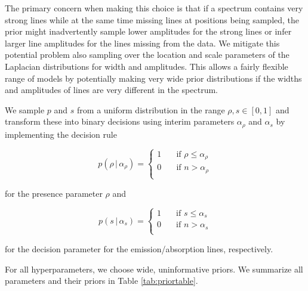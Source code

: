 \documentclass[12pt]{emulateapj}
\newcommand{\given}{\,|\,}
\begin{document}
The primary concern when making this choice is that if a spectrum contains very strong lines while at the same time missing lines at positions being sampled, the prior might inadvertently sample lower amplitudes for the strong lines or infer larger line amplitudes for the lines missing from the data.  
We mitigate this potential problem also sampling over the location and scale parameters of the Laplacian distributions for width and amplitudes. This allows a fairly flexible range of models by potentially making very wide prior distributions if the widths and amplitudes of lines are very different in the spectrum.

We sample $p$ and $s$ from a uniform distribution in the range $\rho, s \in \left[0,1\right]$ and transform these into binary decisions using interim parameters $\alpha_{\rho}$ and $\alpha_s$ by implementing the decision rule

\[ p(\rho \given \alpha_{\rho}) = 
  \begin{cases}
    1       & \quad \text{if } \rho \leq \alpha_{\rho} \\
    0  & \quad \text{if } n > \alpha_{\rho} \\
  \end{cases}
\]

\noindent for the presence parameter $\rho$ and 

\[ p(s \given \alpha_{s}) = 
  \begin{cases}
    1       & \quad \text{if } s \leq \alpha_{s} \\
    0  & \quad \text{if } n > \alpha_{s} \\
  \end{cases}
\]

\noindent for the decision parameter for the emission/absorption lines, respectively.

For all hyperparameters, we choose wide, uninformative priors. We summarize all parameters and their priors in Table \ref{tab:priortable}.
\end{document}
